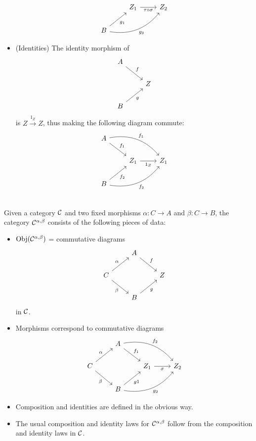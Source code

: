 \begin{xca}
\begin{itemize}
\[\begin{tikzcd}
        & Z_1 \arrow[r, swap, "\tau \circ \sigma"]
        & Z_2 \\
        B \arrow[ru, swap, "g_1"]
        \arrow[rru, swap, bend right, "g_3"]
        & &
    \end{tikzcd}
    \]
    \item (Identities) The identity morphism of
    \[
    \begin{tikzcd}
        A \arrow[rd, "f"] & \\
          & Z \\
        B \arrow[ru, swap, "g"]
    \end{tikzcd}
    \]
    is $Z \xrightarrow{1_Z} Z$, thus making the following diagram commute:
    \[
    \begin{tikzcd}
        A \arrow[rd, "f_1"]
          \arrow[rrd, bend left, "f_1"]
          & & \\
        & Z_1 \arrow[r, swap, "1_Z"]
              & Z_1 \\
        B \arrow[ru, swap, "f_2"]
          \arrow[rru, swap, bend right, "f_2"]
          & &
        \end{tikzcd}
    \]
    \end{itemize}~\\

    Given a category $\mathcal{C}$ and two fixed morphisms $\alpha: C \to A$ and
    $\beta: C \to B$, the category $\mathcal{C}^{\alpha, \beta}$ consists of the
    following pieces of data:
    \begin{itemize}
        \item $\operatorname{Obj}(\mathcal{C}^{\alpha, \beta})$ = commutative diagrams
        \[
        \begin{tikzcd}
            & A \arrow[rd, "f"] & \\
            C \arrow[ru, "\alpha"]
              \arrow[rd, swap, "\beta"]
              & & Z \\
            & B \arrow[ru, swap, "g"] &
        \end{tikzcd}
        \]
        in $\mathcal{C}$.
        \item Morphisms correspond to commutative diagrams
        \[
        \begin{tikzcd}
            & A \arrow[rd, "f_1"]
                \arrow[rrd, bend left, "f_2"] & \\
            C \arrow[ru, "\alpha"]
              \arrow[rd, swap, "\beta"]
              & & Z_1 \arrow[r, swap, "\sigma"]
                      & Z_2 \\
            & B \arrow[ru, swap, "g1"]
                \arrow[rru, swap, bend right, "g_2"] &
        \end{tikzcd}
        \]
        \item Composition and identities are defined in the obvious way.
        \item The usual composition and identity laws for $\mathcal{C}^{\alpha,
        \beta}$ follow from the composition and identity laws in $\mathcal{C}$.
    \end{itemize}
\end{xca}

